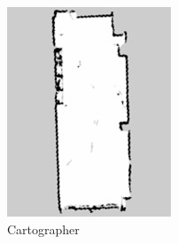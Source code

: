 \begin{figure}[h]
  \begin{center}
  \includegraphics[width=.8\linewidth]{img/slam_35.jpg}
  \caption{Cartographer}
  \label{slam:map:cartographer}
  \end{center}
\end{figure}


